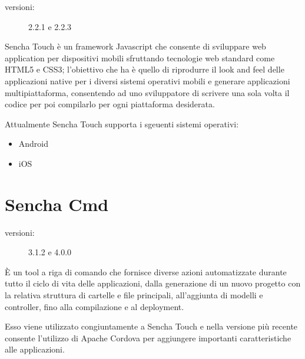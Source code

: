 \begin{description}
\item[versioni:] 2.2.1 e 2.2.3
\end{description}

Sencha Touch è un framework Javascript che consente di sviluppare web application per dispositivi mobili sfruttando tecnologie web standard come \acs{HTML5} e \acs{CSS3}; l'obiettivo che ha è quello di riprodurre il look and feel delle applicazioni native per i diversi sistemi operativi mobili e generare applicazioni multipiattaforma, consentendo ad uno sviluppatore di scrivere una sola volta il codice per poi compilarlo per ogni piattaforma desiderata.

Attualmente Sencha Touch supporta i sgeuenti sistemi operativi:
\begin{itemize}
\item Android
\item iOS
\end{itemize}

\section{Sencha Cmd}
\begin{description}
\item[versioni:] 3.1.2 e 4.0.0
\end{description}

È un tool a riga di comando che fornisce diverse azioni automatizzate durante tutto il ciclo di vita delle applicazioni, dalla generazione di un nuovo progetto con la relativa struttura di cartelle e file principali, all'aggiunta di modelli e controller, fino alla compilazione e al deployment.

Esso viene utilizzato congiuntamente a Sencha Touch e nella versione più recente consente l'utilizzo di Apache Cordova per aggiungere importanti caratteristiche alle applicazioni.
 
